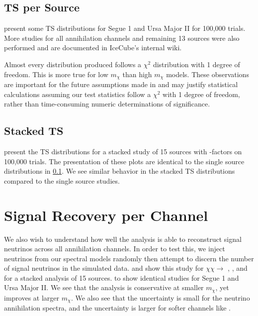 \subsection{TS per Source} \label{sec:icDM_TSperSrc}

 present some TS distributions for Segue 1 and Ursa Major II for 100,000 trials.
More studies for all annihilation channels and remaining 13 sources were also performed and are documented in IceCube's internal wiki.

Almost every distribution produced follows a $\chi^2$ distribution with 1 degree of freedom.
This is more true for low $m_\chi$ than high $m_\chi$ models.
These observations are important for the future assumptions made in  and may justify statistical calculations assuming our test statistics follow a $\chi^2$ with 1 degree of freedom, rather than time-consuming numeric determinations of significance.

\subsection{Stacked TS} \label{sec:icDM_TSstacked}

 present the TS distributions for a stacked study of 15 sources with \GS \J-factors on 100,000 trials.
The presentation of these plots are identical to the single source distributions in \cref{sec:icDM_TSperSrc}.
We see similar behavior in the stacked TS distributions compared to the single source studies.

\section{Signal Recovery per Channel} \label{sec:icDM_sig_recovery}

We also wish to understand how well the analysis is able to reconstruct signal neutrinos across all annihilation channels.
In order to test this, we inject neutrinos from our spectral models randomly then attempt to discern the number of signal neutrinos in the simulated data.
 and  show this study for $\chi\chi \rightarrow$ , , and \parpar{\nu_\mu} for a stacked analysis of 15 sources.
 to  show identical studies for Segue 1 and Ursa Major II.
We see that the analysis is conservative at smaller $m_\chi$, yet improves at larger $m_\chi$.
We also see that the uncertainty is small for the neutrino annihilation spectra, and the uncertainty is larger for softer channels like .


